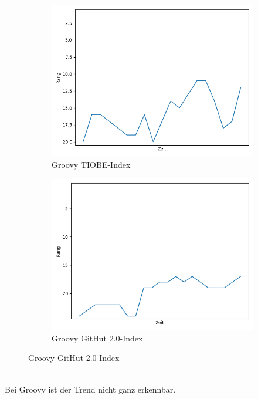 \documentclass[ngerman]{article}
\begin{document}
    \begin{figure}[h!]
        \begin{subfigure}[h!]{.5\textwidth}
            \caption{Groovy TIOBE-Index}
            \centering
            \includegraphics[scale=.25]{GroovyTIOBE.png}
        \end{subfigure}
        \begin{subfigure}[h!]{.5\textwidth}
            \caption{Groovy GitHut 2.0-Index}
            \centering
            \includegraphics[scale=.25]{GroovyGitHut.png}
        \end{subfigure}
    \end{figure}\\
    Bei Groovy ist der Trend nicht ganz erkennbar.\\
\end{document}
